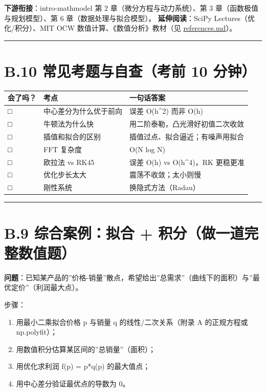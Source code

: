 \textbf{下游衔接}：intro-mathmodel 第 2 章（微分方程与动力系统）、第 3
章（函数极值与规划模型）、第 6 章（数据处理与拟合模型）。
\textbf{延伸阅读}：SciPy Lectures（优化/积分）、MIT OCW
数值计算、《数值分析》教材（见 \href{./references.md}{references.md}）。

\begin{center}\rule{0.5\linewidth}{0.5pt}\end{center}

\section{B.10 常见考题与自查（考前 10
分钟）}\label{b.10-ux5e38ux89c1ux8003ux9898ux4e0eux81eaux67e5ux8003ux524d-10-ux5206ux949f}

{\def\LTcaptype{none} %
\begin{longtable}[]{@{}lll@{}}
\toprule\noalign{}
会了吗？ & 考点 & 一句话答案 \\
\midrule\noalign{}
\endhead
\bottomrule\noalign{}
\endlastfoot
□ & 中心差分为什么优于前向 & 误差 O(h\^{}2) 而非 O(h) \\
□ & 牛顿法为什么快 & 用二阶泰勒，凸光滑好初值二次收敛 \\
□ & 插值和拟合的区别 & 插值过点、拟合逼近；有噪声用拟合 \\
□ & FFT 复杂度 & O(N log N) \\
□ & 欧拉法 vs RK45 & 误差 O(h) vs O(h\^{}4)，RK 更稳更准 \\
□ & 优化步长太大 & 震荡不收敛；太小则慢 \\
□ & 刚性系统 & 换隐式方法（Radau） \\
\end{longtable}
}

\begin{center}\rule{0.5\linewidth}{0.5pt}\end{center}

\section{B.9 综合案例：拟合 +
积分（做一道完整数值题）}\label{b.9-ux7efcux5408ux6848ux4f8bux62dfux5408-ux79efux5206ux505aux4e00ux9053ux5b8cux6574ux6570ux503cux9898}

\textbf{问题}：已知某产品的''价格-销量''散点，希望给出''总需求''（曲线下的面积）与''最优定价''（利润最大点）。

步骤：

\begin{enumerate}
\def\labelenumi{\arabic{enumi}.}
\tightlist
\item
  用最小二乘拟合价格 p 与销量 q 的线性/二次关系（附录 A 的正规方程或
  np.polyfit）；
\item
  用数值积分估算某区间的''总销量''（面积）；
\item
  用优化求利润 f(p) = p*q(p) 的最大值点；
\item
  用中心差分验证最优点的导数为 0。
\end{enumerate}

